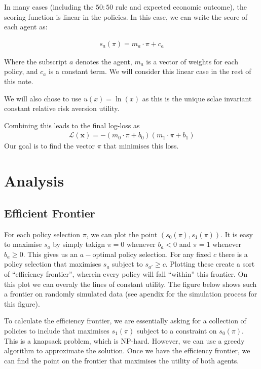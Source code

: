 \documentclass[11pt]{article}
\begin{document}
In many cases (including the $50:50$ rule and expceted economic outcome), the scoring function is linear in the policies. In this case, we can write the score of each agent as:

\begin{align*}
    s_a(\pi)=m_a\cdot\pi + c_a
\end{align*}

Where the subscript $a$ denotes the agent, $m_a$ is a vector of weights for each policy, and $c_a$ is a constant term. We will consider this linear case in the rest of this note.

We will also chose to use $u(x)=\ln(x)$ as this is the unique sclae invariant constant relative risk aversion utility.

Combining this leads to the final log-loss as 
\begin{align*}
    \mathcal{L}(\mathbf{x})=-\left(m_0\cdot\pi+b_0\right)\left(m_1\cdot\pi+b_1\right)
\end{align*}
Our goal is to find the vector $\pi$ that minimises this loss.

\section{Analysis}
\subsection{Efficient Frontier}
For each policy selection $\pi$, we can plot the point $(s_0(\pi), s_1(\pi))$. It is easy to maximise $s_a$ by simply takign $\pi=0$ whenever $b_a<0$ and $\pi=1$ whenever $b_a\geq 0$. This gives us an $a-$optimal policy selection. For any fixed $c$ there is a policy selection that maximises $s_a$ subject to $s_{a'}\geq c$. Plotting these create a sort of ``efficiency frontier'', wherein every policy will fall ``within'' this frontier. On this plot we can overaly the lines of constant utility. The figure below shows such a frontier on randomly simulated data (see apendix for the simulation process for this figure).

To calculate the efficiency frontier, we are essentially asking for a collection of policies to include that maximises $s_1(\pi)$ subject to a constraint on $s_0(\pi)$. This is a knapsack problem, which is NP-hard. However, we can use a greedy algorithm to approximate the solution. Once we have the efficiency frontier, we can find the point on the frontier that maximises the utility of both agents.
\end{document}
